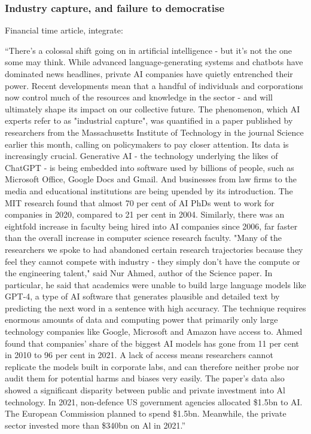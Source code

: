 \subsubsection{Industry capture, and failure to democratise}
Financial time article, integrate:
\begin{tcolorbox}[enhanced, frame style={fill=lightgray}, interior style={fill=lightgray}]``There's a colossal shift going on in artificial intelligence - but it's not the one some may think. While advanced language-generating systems and chatbots have dominated news headlines, private AI companies have quietly entrenched their power. Recent developments mean that a handful of individuals and corporations now control much of the resources and knowledge in the sector - and will ultimately shape its impact on our collective future. The phenomenon, which AI experts refer to as "industrial capture", was quantified in a paper published by researchers from the Massachusetts Institute of Technology in the journal Science earlier this month, calling on policymakers to pay closer attention. Its data is increasingly crucial. Generative AI - the technology underlying the likes of ChatGPT - is being embedded into software used by billions of people, such as Microsoft Office, Google Docs and Gmail. And businesses from law firms to the media and educational institutions are being upended by its introduction.
The MIT research found that almost 70 per cent of AI PhDs went to work for companies in 2020, compared to 21 per cent in 2004. Similarly, there was an eightfold increase in faculty being hired into AI companies since 2006, far faster than the overall increase in computer science research faculty. "Many of the researchers we spoke to had abandoned certain research trajectories because they feel they cannot compete with industry - they simply don't have the compute or the engineering talent," said Nur Ahmed, author of the Science paper. In particular, he said that academics were unable to build large language models like GPT-4, a type of AI software that generates plausible and detailed text by predicting the next word in a sentence with high accuracy. The technique requires enormous amounts of data and computing power that primarily only large technology companies like Google, Microsoft and Amazon have access to. Ahmed found that companies' share of the biggest AI models has gone from 11 per cent in 2010 to 96 per cent in 2021. A lack of access means researchers cannot replicate the models built in corporate labs, and can therefore neither probe nor audit them for potential harms and biases very easily. The paper's data also showed a significant disparity between public and private investment into Al technology. In 2021, non-defence US government agencies allocated \$1.5bn to AI. The European Commission planned to spend \$1.5bn. Meanwhile, the private sector invested more than \$340bn on Al in 2021.''
\end{tcolorbox}

